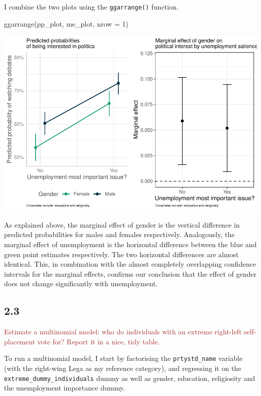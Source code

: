 \documentclass[
]{article}
\newenvironment{Shaded}{\begin{snugshade}}{\end{snugshade}}
\newcommand{\AttributeTok}[1]{\textcolor[rgb]{0.77,0.63,0.00}{#1}}
\newcommand{\DecValTok}[1]{\textcolor[rgb]{0.00,0.00,0.81}{#1}}
\newcommand{\FunctionTok}[1]{\textcolor[rgb]{0.00,0.00,0.00}{#1}}
\newcommand{\NormalTok}[1]{#1}
\begin{document}
I combine the two plots using the \texttt{ggarrange()} function.

\begin{Shaded}
\begin{Highlighting}[]
\FunctionTok{ggarrange}\NormalTok{(pp\_plot, me\_plot, }\AttributeTok{nrow =} \DecValTok{1}\NormalTok{)}
\end{Highlighting}
\end{Shaded}

\includegraphics{AVCD-Assignment2-Edenhofer_files/figure-latex/pp-and-me-combined-1.pdf}

As explained above, the marginal effect of gender is the vertical
difference in predicted probabilities for males and females
respectively. Analogously, the marginal effect of unemployment is the
horizontal difference between the blue and green point estimates
respectively. The two horizontal differences are almost identical. This,
in combination with the almost completely overlapping confidence
intervals for the marginal effects, confirms our conclusion that the
effect of gender does not change significantly with unemployment.

\hypertarget{section-5}{%
\subsection{2.3}\label{section-5}}

\textcolor{brown}{Estimate a multinomial model: who do individuals with an extreme right-left self-placement vote for? Report it in a nice, tidy table.}

To run a multinomial model, I start by factorising the
\texttt{prtystd\_name} variable (with the right-wing Lega as my
reference category), and regressing it on the
\texttt{extreme\_dummy\_individuals} dummy as well as gender, education,
religiosity and the unemployment importance dummy.
\end{document}

